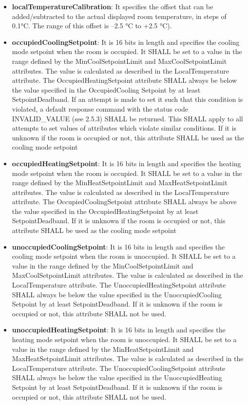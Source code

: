 \begin{itemize}
\item \textbf{localTemperatureCalibration}: It specifies the offset that can be added/subtracted to the actual displayed room temperature, in steps of 0.1°C. The range of this offset is –2.5 °C to +2.5 °C).
\item \textbf{occupiedCoolingSetpoint}: It is 16 bits in length and specifies the cooling mode setpoint when the room is occupied. It SHALL be set to a value in the range defined by the MinCoolSetpointLimit and MaxCoolSetpointLimit attributes. The value is calculated as described in the LocalTemperature attribute. The OccupiedHeatingSetpoint attribute SHALL always be below the value specified in the OccupiedCooling Setpoint by at least SetpointDeadband. If an attempt is made to set it such that this condition is violated, a default response command with the status code INVALID\_VALUE (see 2.5.3) SHALL be returned. This SHALL apply to all attempts to set values of attributes which violate similar conditions. If it is unknown if the room is occupied or not, this attribute SHALL be used as the cooling mode setpoint
\item \textbf{occupiedHeatingSetpoint}: It  is 16 bits in length and specifies the heating mode setpoint when the room is occupied. It SHALL be set to a value in the range defined by the MinHeatSetpointLimit and MaxHeatSetpointLimit attributes. The value is calculated as described in the LocalTemperature attribute. The OccupiedCoolingSetpoint attribute SHALL always be above the value specified in the OccupiedHeatingSetpoint by at least SetpointDeadband. If it is unknown if the room is occupied or not, this attribute SHALL be used as the cooling mode setpoint
\item \textbf{unoccupiedCoolingSetpoint}: It  is 16 bits in length and specifies the cooling mode setpoint when the room is unoccupied. It SHALL be set to a value in the range defined by the MinCoolSetpointLimit and MaxCoolSetpointLimit attributes. The value is calculated as described in the LocalTemperature attribute. The UnoccupiedHeatingSetpoint attribute SHALL always be below the value specified in the UnoccupiedCooling Setpoint by at least SetpointDeadband. If it is unknown if the room is occupied or not, this attribute SHALL not be used.
\item \textbf{unoccupiedHeatingSetpoint}: It is 16 bits in length and specifies the heating mode setpoint when the room is unoccupied. It SHALL be set to a value in the range defined by the MinHeatSetpointLimit and MaxHeatSetpointLimit attributes. The value is calculated as described in the LocalTemperature attribute. The UnoccupiedCoolingSetpoint attribute SHALL always be below the value specified in the UnoccupiedHeating Setpoint by at least SetpointDeadband. If it is unknown if the room is occupied or not, this attribute SHALL not be used.

\end{itemize}

